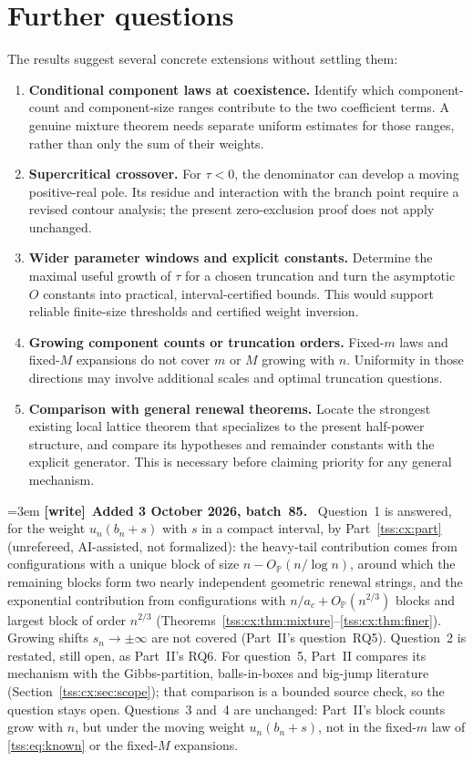 \documentclass[11pt]{article}
\theoremstyle{remark}\newtheorem{remark}[theorem]{Remark}
\theoremstyle{definition}\newtheorem{definition}[theorem]{Definition}
\newcommand{\Prob}{\mathbb P}
\newenvironment{writenote}[1][]{\par\smallskip\begingroup\small\emergencystretch=3em
 \noindent\textbf{[write]}\if\relax\detokenize{#1}\relax\else~\textbf{#1.}\fi\ }%
 {\par\endgroup\smallskip}
\begin{document}
\section{Further questions}
\label{tss:sec:questions}
The results suggest several concrete extensions without settling them:
\begin{enumerate}
\item \textbf{Conditional component laws at coexistence.} Identify which component-count and component-size ranges contribute to the two coefficient terms. A genuine mixture theorem needs separate uniform estimates for those ranges, rather than only the sum of their weights.
\item \textbf{Supercritical crossover.} For $\tau<0$, the denominator can develop a moving positive-real pole. Its residue and interaction with the branch point require a revised contour analysis; the present zero-exclusion proof does not apply unchanged.
\item \textbf{Wider parameter windows and explicit constants.} Determine the maximal useful growth of $\tau$ for a chosen truncation and turn the asymptotic $O$ constants into practical, interval-certified bounds. This would support reliable finite-size thresholds and certified weight inversion.
\item \textbf{Growing component counts or truncation orders.} Fixed-$m$ laws and fixed-$M$ expansions do not cover $m$ or $M$ growing with $n$. Uniformity in those directions may involve additional scales and optimal truncation questions.
\item \textbf{Comparison with general renewal theorems.} Locate the strongest existing local lattice theorem that specializes to the present half-power structure, and compare its hypotheses and remainder constants with the explicit generator. This is necessary before claiming priority for any general mechanism.
\end{enumerate}

\begin{writenote}[Added 3 October 2026, batch~85]
Question~1 is answered, for the weight $u_n(b_n+s)$ with $s$ in a compact
interval, by Part~\ref{tss:cx:part} (unrefereed, AI-assisted, not
formalized): the heavy-tail contribution comes from configurations with a
unique block of size $n-O_{\Prob}(n/\log n)$, around which the remaining
blocks form two nearly independent geometric renewal strings, and the
exponential contribution from configurations with $n/a_c+O_{\Prob}(n^{2/3})$
blocks and largest block of order $n^{2/3}$
(Theorems~\ref{tss:cx:thm:mixture}--\ref{tss:cx:thm:finer}). Growing shifts
$s_n\to\pm\infty$ are not covered (Part~II's question~RQ5). Question~2 is
restated, still open, as Part~II's RQ6. For question~5, Part~II compares
its mechanism with the Gibbs-partition, balls-in-boxes and big-jump
literature (Section~\ref{tss:cx:sec:scope}); that comparison is a bounded
source check, so the question stays open. Questions~3 and~4 are unchanged:
Part~II's block counts grow with $n$, but under the moving weight
$u_n(b_n+s)$, not in the fixed-$m$ law of \eqref{tss:eq:known} or the
fixed-$M$ expansions.
\end{writenote}
\end{document}
